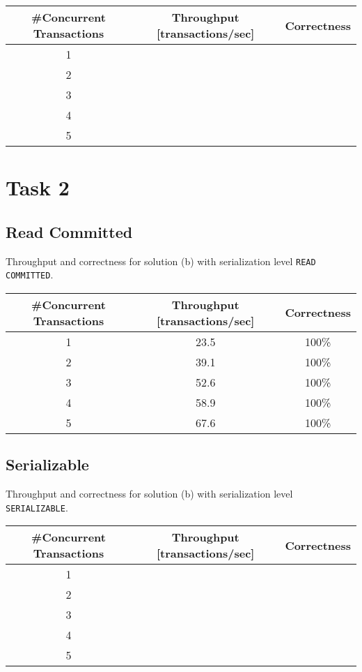 \documentclass[11pt]{scrartcl}
\begin{document}
\bigskip

\begin{tabular}{c|c|c}
  \#Concurrent Transactions & Throughput [transactions/sec] & Correctness
  \\\hline
  1 & & \\
  2 & & \\
  3 & & \\
  4 & & \\
  5 & & \\    
\end{tabular}

\medskip

\section*{Task 2}

\subsection*{Read Committed}

Throughput and correctness for solution (b) with serialization level
{\tt\small READ COMMITTED}.

\bigskip

\begin{tabular}{c|c|c}
  \#Concurrent Transactions & Throughput [transactions/sec] & Correctness
  \\\hline
  1 & 23.5 & 100\% \\
  2 & 39.1 & 100\% \\
  3 & 52.6 & 100\% \\
  4 & 58.9 & 100\% \\
  5 & 67.6 & 100\% \\    
\end{tabular}

\medskip

\subsection*{Serializable}

Throughput and correctness for solution (b) with serialization level
{\tt\small SERIALIZABLE}.

\bigskip

\begin{tabular}{c|c|c}
  \#Concurrent Transactions & Throughput [transactions/sec] & Correctness
  \\\hline
  1 & & \\
  2 & & \\
  3 & & \\
  4 & & \\
  5 & & \\    
\end{tabular}
\end{document}
